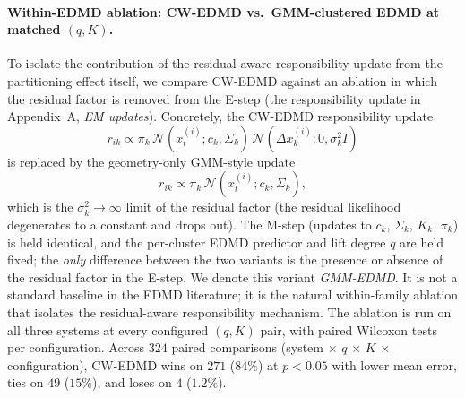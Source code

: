 \documentclass{article}
\begin{document}
\paragraph{Within-EDMD ablation: CW-EDMD vs.\ GMM-clustered EDMD at matched $(q, K)$.} To isolate the contribution of the residual-aware responsibility update from the partitioning effect itself, we compare CW-EDMD against an ablation in which the residual factor is removed from the E-step (the responsibility update in Appendix~A, \emph{EM updates}). Concretely, the CW-EDMD responsibility update
\[
r_{ik} \propto \pi_k\, \mathcal{N}(x_t^{(i)}; c_k, \Sigma_k)\, \mathcal{N}(\Delta x_k^{(i)}; 0, \sigma_k^2 I)
\]
is replaced by the geometry-only GMM-style update
\[
r_{ik} \propto \pi_k\, \mathcal{N}(x_t^{(i)}; c_k, \Sigma_k),
\]
which is the $\sigma_k^2 \to \infty$ limit of the residual factor (the residual likelihood degenerates to a constant and drops out). The M-step (updates to $c_k$, $\Sigma_k$, $K_k$, $\pi_k$) is held identical, and the per-cluster EDMD predictor and lift degree $q$ are held fixed; the \emph{only} difference between the two variants is the presence or absence of the residual factor in the E-step. We denote this variant \emph{GMM-EDMD}. It is not a standard baseline in the EDMD literature; it is the natural within-family ablation that isolates the residual-aware responsibility mechanism. The ablation is run on all three systems at every configured $(q, K)$ pair, with paired Wilcoxon tests per configuration. Across $324$ paired comparisons (system $\times$ $q$ $\times$ $K$ $\times$ configuration), CW-EDMD wins on $271$ ($84\%$) at $p<0.05$ with lower mean error, ties on $49$ ($15\%$), and loses on $4$ ($1.2\%$).
\end{document}
